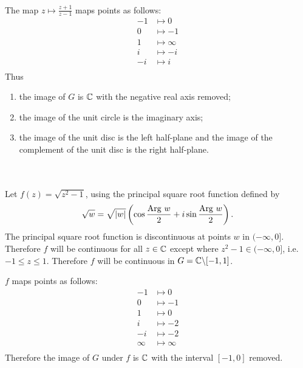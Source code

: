 \documentclass[12pt]{article}
\begin{document}
\begin{description}
 \\
The map $z \mapsto \frac{z+1}{z-1}$ maps points as follows:
\begin{align*}
  -1 &\mapsto 0  \\
  0 &\mapsto -1  \\
  1 &\mapsto \infty \\
  i &\mapsto -i \\
  -i &\mapsto i \\
\end{align*}
Thus
\begin{enumerate}
\item the image of $G$ is $\mathbb{C}$ with the negative real axis removed;
\item the image of the unit circle is the imaginary axis;
\item the image of the unit disc is the left half-plane and the image of the
  complement of the unit disc is the right half-plane.
\end{enumerate}


 \\\\
Let $f(z) = \sqrt{z^2 - 1}$, using the principal square root function defined by
\begin{align*}
  \sqrt w = \sqrt{|w|}\left(\cos\frac{\text{Arg}~ w}{2} + i\sin\frac{\text{Arg}~ w}{2}\right).
\end{align*}
The principal square root function is discontinuous at points $w$ in
$(-\infty, 0]$. Therefore $f$ will be continuous for all $z \in \mathbb{C}$ except
where $z^2 - 1 \in (-\infty, 0]$, i.e.  $-1 \leq z \leq 1$. Therefore $f$ will
be continuous in $G = \mathbb{C} \backslash [-1, 1]$.





$f$ maps points as follows:
\begin{align*}
  -1 &\mapsto 0  \\
  0 &\mapsto -1  \\
  1 &\mapsto 0 \\
  i &\mapsto -2 \\
  -i &\mapsto -2 \\
  \infty &\mapsto \infty \\
\end{align*}
Therefore the image of $G$ under $f$ is $\mathbb{C}$ with the interval $[-1, 0]$ removed.


\end{description}
\end{document}

